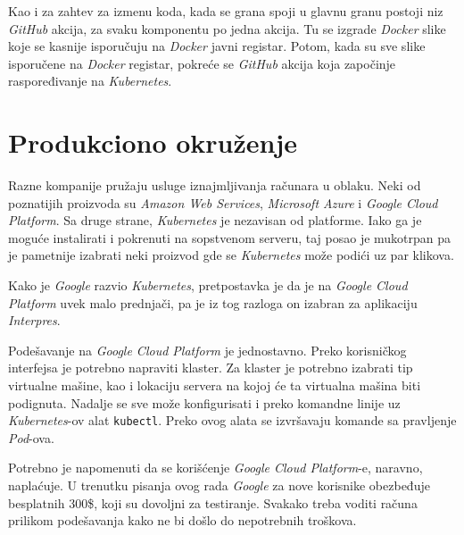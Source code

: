 Kao i za zahtev za izmenu koda, kada se grana spoji u glavnu granu 
postoji niz \textit{GitHub} akcija, za svaku komponentu po jedna akcija.
Tu se izgrade \textit{Docker} slike koje se kasnije isporučuju na 
\textit{Docker} javni registar. Potom, kada su sve slike isporučene na 
\textit{Docker} registar, pokreće se \textit{GitHub} akcija koja započinje 
raspoređivanje na \textit{Kubernetes}.

\section{Produkciono okruženje}
Razne kompanije pružaju usluge iznajmljivanja računara u oblaku. Neki od 
poznatijih proizvoda su \textit{Amazon Web Services}, \textit{Microsoft Azure}
i \textit{Google Cloud Platform}. Sa druge strane, \textit{Kubernetes} je 
nezavisan od platforme. Iako ga je moguće instalirati i pokrenuti na sopstvenom 
serveru, taj posao je mukotrpan pa je pametnije izabrati neki proizvod gde se 
\textit{Kubernetes} može podići uz par klikova. 

Kako je \textit{Google} razvio \textit{Kubernetes}, pretpostavka je da je 
na \textit{Google Cloud Platform} uvek malo prednjači, pa je iz tog razloga 
on izabran za aplikaciju \textit{Interpres}.

Podešavanje na \textit{Google Cloud Platform} je jednostavno. Preko 
korisničkog interfejsa je potrebno napraviti klaster. Za klaster je 
potrebno izabrati tip virtualne mašine, kao i lokaciju servera na kojoj 
će ta virtualna mašina biti podignuta. Nadalje se sve može konfigurisati 
i preko komandne linije uz \textit{Kubernetes}-ov alat \texttt{kubectl}.
Preko ovog alata se izvršavaju komande sa pravljenje \textit{Pod}-ova.

Potrebno je napomenuti da se korišćenje \textit{Google Cloud Platform}-e,
naravno, naplaćuje. U trenutku pisanja ovog rada \textit{Google} za nove 
korisnike obezbeđuje besplatnih 300\$, koji su dovoljni za testiranje.
Svakako treba voditi računa prilikom podešavanja kako ne bi došlo do 
nepotrebnih troškova.

